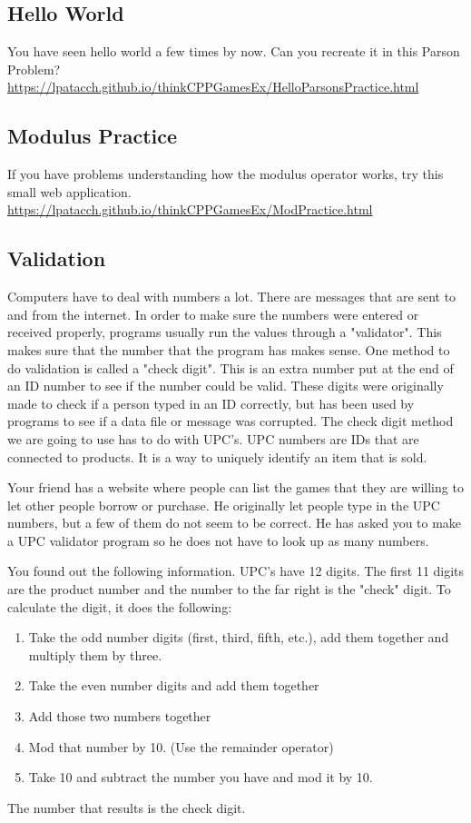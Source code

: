 \subsection{Hello World}
You have seen hello world a few times by now. Can you recreate it in this Parson Problem? 
\url{https://lpatacch.github.io/thinkCPPGamesEx/HelloParsonsPractice.html} 
\subsection{Modulus Practice}
If you have problems understanding how the modulus operator works, try this small web application.
\url{https://lpatacch.github.io/thinkCPPGamesEx/ModPractice.html}
\subsection{Validation}
Computers have to deal with numbers a lot. There are messages that are sent to and from the internet. In order to make sure the numbers were entered or received properly, programs usually
run the values through a "validator". This makes sure that the
number that the program has makes sense. One method to 
do validation is called a "check digit". This is an extra number
put at the end of an ID number to see if the number could
be valid. These digits were originally made to check if a 
person typed in an ID correctly, but has been used by programs
to see if a data file or message was corrupted. The check digit
method we are going to use has to do with UPC's. UPC numbers are IDs that are connected to products. It is a way to uniquely identify an item that is sold.

Your friend has a website where people can list the games that
they are willing to let other people borrow or purchase. He
originally let people type in the UPC numbers, but a few of 
them do not seem to be correct. He has asked you to make a 
UPC validator program so he does not have to look up as many 
numbers.

You found out the following information. UPC's have 12 digits.
The first 11 digits are the product number and the number to the
far right is the "check" digit. To calculate the digit, it does
the following:
\begin{enumerate}
    \item Take the odd number digits (first, third, fifth, etc.), add them together and multiply them by three.
    \item Take the even number digits and add them together
    \item Add those two numbers together
    \item Mod that number by 10. (Use the remainder operator)
    \item Take 10 and subtract the number you have and mod it by 10. 
\end{enumerate}
The number that results is the check digit.

